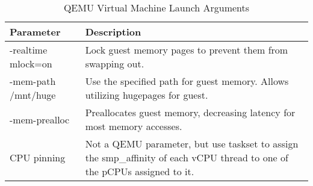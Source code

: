 \begin{table}
    \centering
    \caption{QEMU Virtual Machine Launch Arguments}
    \label{tab:qemu_params_table}
\begin{tabular}{|l|p{10cm}|}
\hline
Parameter & Description \\
\hline \hline
-realtime mlock=on & Lock guest memory pages to prevent them from swapping out.\\ 
\hline
-mem-path /mnt/huge & Use the specified path for guest memory.  Allows utilizing hugepages for guest.\\
\hline
-mem-prealloc & Preallocates guest memory, decreasing latency for most memory accesses.\\
\hline
CPU pinning & Not a QEMU parameter, but use taskset to assign the smp\_affinity of each vCPU thread to one of the pCPUs assigned to it.\\
\hline
\end{tabular}
\end{table}

